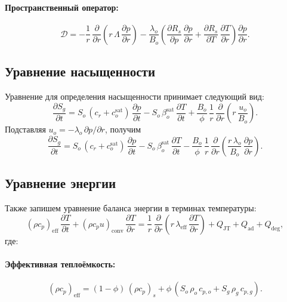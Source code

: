 \documentclass[12pt,a4paper]{article}
\newcommand{\pp}{\partial}
\newcommand{\eff}{\mathrm{eff}}
\newcommand{\sat}{\mathrm{sat}}
\begin{document}
\paragraph{Пространственный оператор:}
\begin{equation}\label{eq:D_operator}
  \mathcal{D} = -\frac{1}{r}\,\frac{\pp}{\pp r}\!\left(
      r\,\Lambda\,\frac{\pp p}{\pp r}
    \right)
    - \frac{\lambda_o}{B_o}\!\left(
      \frac{\pp R_s}{\pp p}\,\frac{\pp p}{\pp r}
      + \frac{\pp R_s}{\pp T}\,\frac{\pp T}{\pp r}
    \right)\frac{\pp p}{\pp r}.
\end{equation}

\subsection{Уравнение насыщенности}

Уравнение для определения насыщенности принимает следующий вид:
\begin{equation}\label{eq:Sg_eq}
  \boxed{
    \frac{\pp S_g}{\pp t}
    = S_o\,(c_r + c_o^\sat)\,\frac{\pp p}{\pp t}
      - S_o\,\beta_o^\sat\,\frac{\pp T}{\pp t}
      + \frac{B_o}{\phi}\,\frac{1}{r}\,\frac{\pp}{\pp r}\!
        \left(r\,\frac{u_o}{B_o}\right).
  }
\end{equation}
Подставляя $u_o = -\lambda_o\,\pp p/\pp r$, получим
\begin{equation}\label{eq:Sg_eq2}
  \frac{\pp S_g}{\pp t}
  = S_o\,(c_r + c_o^\sat)\,\frac{\pp p}{\pp t}
    - S_o\,\beta_o^\sat\,\frac{\pp T}{\pp t}
    - \frac{B_o}{\phi}\,\frac{1}{r}\,\frac{\pp}{\pp r}\!
      \left(\frac{r\,\lambda_o}{B_o}\,\frac{\pp p}{\pp r}\right).
\end{equation}

\subsection{Уравнение энергии}

Также запишем уравнение баланса энергии в терминах температуры:
\begin{equation}\label{eq:energy}
  \boxed{
    (\rho c_p)_\eff\,\frac{\pp T}{\pp t}
    + (\rho c_p u)_\mathrm{conv}\,\frac{\pp T}{\pp r}
    = \frac{1}{r}\,\frac{\pp}{\pp r}\!\left(
        r\,\lambda_\eff\,\frac{\pp T}{\pp r}
      \right)
    + Q_\mathrm{JT} + Q_\mathrm{ad} + Q_\mathrm{deg},
  }
\end{equation}
где:

\paragraph{Эффективная теплоёмкость:}
\begin{equation}\label{eq:rhocp_eff}
  (\rho c_p)_\eff
  = (1-\phi)\,(\rho c_p)_s
    + \phi\,(S_o\,\rho_o\,c_{p,o} + S_g\,\rho_g\,c_{p,g}).
\end{equation}
\end{document}
